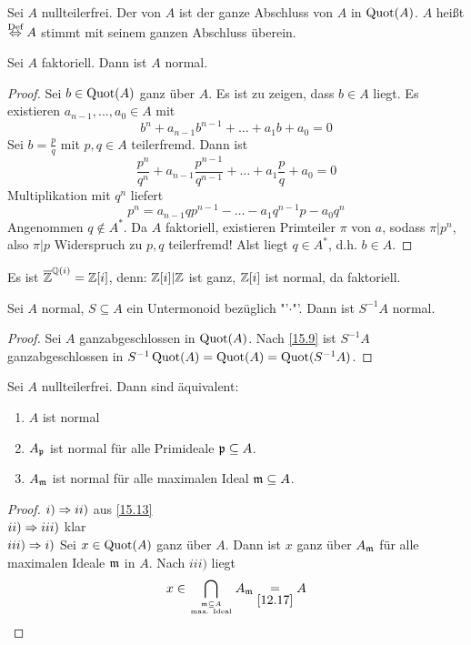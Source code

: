 \begin{df}
	Sei $A$ nullteilerfrei. Der  von $A$ ist der ganze Abschluss von $A$ in $\operatorname{Quot}(A)$. $A$ heißt  $\overset{\text{Def}}{\Leftrightarrow} A$ stimmt mit seinem ganzen Abschluss überein.
\end{df}
\begin{bem}\label{15.11}
	Sei $A$ faktoriell. Dann ist $A$ normal.
\end{bem}
\begin{proof}
	Sei $b\in \operatorname{Quot}(A)$ ganz über $A$. Es ist zu zeigen, dass $b\in A$ liegt. Es existieren $a_{n-1}, \ldots, a_0\in A$ mit 
	$$b^n + a_{n-1} b^{n-1} + \ldots + a_1 b + a_0 =0$$
	Sei $b=\frac{p}{q}$ mit $p,q\in A$ teilerfremd. Dann ist
	$$\frac{p^n}{q^n} + a_{n-1} \frac{p^{n-1}}{q^{n-1}} + \ldots + a_1 \frac{p}{q} + a_0=0$$
	Multiplikation mit $q^n$ liefert
	$$p^n = a_{n-1}qp^{n-1} - \ldots - a_1 q^{n-1} p - a_0 q^n$$
	Angenommen $q\notin A^*$. Da $A$ faktoriell, existieren Primteiler $\pi$ von $a$, sodass $\pi |p^n$, also $\pi|p$ Widerspruch zu $p,q$ teilerfremd! Alst liegt $q\in A^*$, d.h. $b\in A$.
\end{proof}
\begin{bsp}
	Es ist $\overline {\mathbb{Z}}^{\mathbb{Q}(i)} = \mathbb{Z}[i]$, denn: $\mathbb{Z}[i]|\mathbb{Z}$ ist ganz, $\mathbb{Z}[i]$ ist normal, da faktoriell.
\end{bsp}
\begin{bem}\label{15.13}
	Sei $A$ normal, $S\subseteq A$ ein Untermonoid bezüglich "'$\cdot$"'. Dann ist $S^{-1}A$ normal.
\end{bem}
\begin{proof}
	Sei $A$ ganzabgeschlossen in $\operatorname{Quot}(A)$. Nach \ref{15.9} ist $S^{-1}A$ ganzabgeschlossen in $S^{-1}\operatorname{Quot}(A)= \operatorname{Quot}(A) = \operatorname{Quot}(S^{-1}A)$.
\end{proof}
\begin{bem}\label{15.14}
	Sei $A$ nullteilerfrei. Dann sind äquivalent:
	\begin{enumerate}[label= \roman*)]
		\item $A$ ist normal
		\item $A_{\mathfrak{p}}$ ist normal für alle Primideale $\mathfrak{p}\subseteq A$.
		\item $A_{\mathfrak{m}}$ ist normal für alle maximalen Ideal $\mathfrak{m}\subseteq A$.
	\end{enumerate}
\end{bem}
\begin{proof}
	$i)\Rightarrow ii)$ aus \ref{15.13}\\
	$ii)\Rightarrow iii)$ klar\\
	$iii)\Rightarrow i)$ Sei $x\in \operatorname{Quot}(A)$ ganz über $A$. Dann ist $x$ ganz über $A_{\mathfrak{m}}$ für alle maximalen Ideale $\mathfrak{m}$ in $A$. Nach $iii)$ liegt 
	$$x\in \bigcap_{\mathfrak{m}\subseteq A \atop \text{max. Ideal}} A_{\mathfrak{m}} \underset{\ref{12.17}}{=} A$$
\end{proof}
